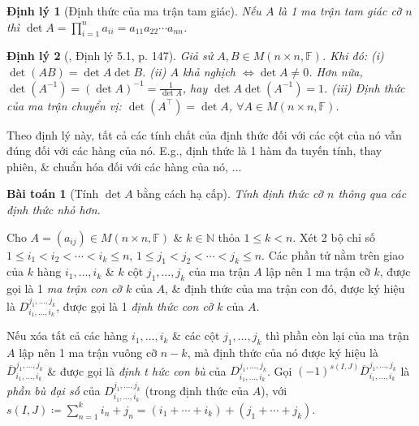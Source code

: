 \documentclass{article}
\newtheorem{baitoan}{Bài toán}
\newtheorem{dinhly}{Định lý}
\begin{document}
\begin{dinhly}[Định thức của ma trận tam giác]
	Nếu $A$ là 1 ma trận tam giác cỡ $n$ thì $\det A = \prod_{i=1}^n a_{ii} = a_{11}a_{22}\cdots a_{nn}$.
\end{dinhly}

\begin{dinhly}[\cite{Hung_linear_algebra}, Định lý 5.1, p. 147]
	Giả sử $A,B\in M(n\times n,\mathbb{F})$. Khi đó: (i) $\det(AB) = \det A\det B$. (ii) $A$ khả nghịch $\Leftrightarrow\det A\ne0$. Hơn nữa, $\det(A^{-1}) = (\det A)^{-1} = \frac{1}{\det A}$, hay $\det A\det(A^{-1}) = 1$. (iii) Định thức của ma trận chuyển vị: $\det(A^\top) = \det A$, $\forall A\in M(n\times n,\mathbb{F})$.
\end{dinhly}
Theo định lý này, tất cả các tính chất của định thức đối với các cột của nó vẫn đúng đối với các hàng của nó. E.g., định thức là 1 hàm đa tuyến tính, thay phiên, \& chuẩn hóa đối với các hàng của nó, $\ldots$

\begin{baitoan}[Tính $\det A$ bằng cách hạ cấp]
	Tính định thức cỡ $n$ thông qua các định thức nhỏ hơn.
\end{baitoan}
Cho $A = (a_{ij})\in M(n\times n,\mathbb{F})$ \& $k\in\mathbb{N}$ thỏa $1\le k < n$. Xét 2 bộ chỉ số $1\le i_1 < i_2 < \cdots < i_k\le n$, $1\le j_1 < j_2 < \cdots < j_k\le n$. Các phần tử nằm trên giao của $k$ hàng $i_1,\ldots,i_k$ \& $k$ cột $j_1,\ldots,j_k$ của ma trận $A$ lập nên 1 ma trận cỡ $k$, được gọi là 1 {\it ma trận con cỡ $k$} của $A$, \& định thức của ma trận con đó, được ký hiệu là $D_{i_1,\ldots,i_k}^{j_1,\ldots,j_k}$, được gọi là 1 {\it định thức con cỡ $k$} của $A$.

Nếu xóa tất cả các hàng $i_1,\ldots,i_k$ \& các cột $j_1,\ldots,j_k$ thì phần còn lại của ma trận $A$ lập nên 1 ma trận vuông cỡ $n - k$, mà định thức của nó được ký hiệu là $\overline{D}_{i_1,\ldots,i_k}^{j_1,\ldots,j_k}$ \& được gọi là {\it định t hức con bù} của $D_{i_1,\ldots,i_k}^{j_1,\ldots,j_k}$. Gọi $(-1)^{s(I,J)}\overline{D}_{i_1,\ldots,i_k}^{j_1,\ldots,j_k}$ là {\it phần bù đại số} của $D_{i_1,\ldots,i_k}^{j_1,\ldots,j_k}$ (trong định thức của $A$), với $s(I,J)\coloneqq\sum_{n=1}^k i_n + j_n = (i_1 + \cdots + i_k) + (j_1 + \cdots + j_k)$.
\end{document}
